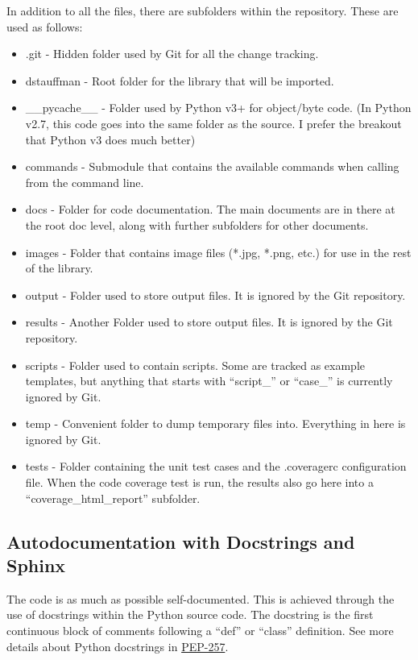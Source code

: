 \documentclass[12pt]{article}
\begin{document}
In addition to all the files, there are subfolders within the repository.  These are used as follows:
\begin{itemize}
    \setlength{\itemsep}{0pt}
    \setlength{\parskip}{0pt}
    \setlength{\parsep}{0pt}
    \item .git - Hidden folder used by Git for all the change tracking.
    \item dstauffman - Root folder for the library that will be imported.
    \item \_\_pycache\_\_ - Folder used by Python v3+ for object/byte code.  (In Python v2.7, this code goes into the same folder as the source. I prefer the breakout that Python v3 does much better)
    \item commands - Submodule that contains the available commands when calling from the command line.
    \item docs - Folder for code documentation.  The main documents are in there at the root doc level, along with further subfolders for other documents.
    \item images - Folder that contains image files (*.jpg, *.png, etc.) for use in the rest of the library.
    \item output - Folder used to store output files.  It is ignored by the Git repository.
    \item results - Another Folder used to store output files.  It is ignored by the Git repository.
    \item scripts - Folder used to contain scripts.  Some are tracked as example templates, but anything that starts with ``script\_'' or ``case\_'' is currently ignored by Git.
    \item temp - Convenient folder to dump temporary files into.  Everything in here is ignored by Git.
    \item tests - Folder containing the unit test cases and the .coveragerc configuration file.  When the code coverage test is run, the results also go here into a ``coverage\_html\_report'' subfolder.
\end{itemize}

\subsection{Autodocumentation with Docstrings and Sphinx}\label{h2:autodoc}
The code is as much as possible self-documented.  This is achieved through the use of docstrings within the Python source code.  The docstring is the first continuous block of comments following a ``def'' or ``class'' definition.  See more details about Python docstrings in \href{https://www.python.org/dev/peps/pep-0257/}{PEP-257}.
\end{document}
